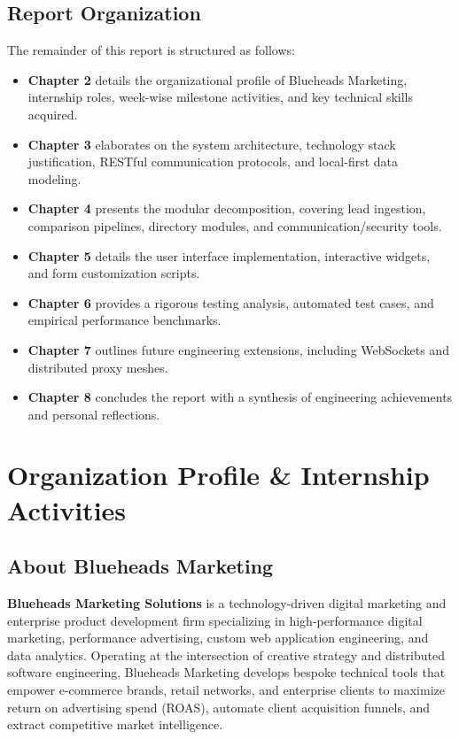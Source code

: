 \documentclass[12pt,a4paper,oneside]{report}
\begin{document}
\section{Report Organization}
The remainder of this report is structured as follows:
\begin{itemize}
    \item \textbf{Chapter 2} details the organizational profile of Blueheads Marketing, internship roles, week-wise milestone activities, and key technical skills acquired.
    \item \textbf{Chapter 3} elaborates on the system architecture, technology stack justification, RESTful communication protocols, and local-first data modeling.
    \item \textbf{Chapter 4} presents the modular decomposition, covering lead ingestion, comparison pipelines, directory modules, and communication/security tools.
    \item \textbf{Chapter 5} details the user interface implementation, interactive widgets, and form customization scripts.
    \item \textbf{Chapter 6} provides a rigorous testing analysis, automated test cases, and empirical performance benchmarks.
    \item \textbf{Chapter 7} outlines future engineering extensions, including WebSockets and distributed proxy meshes.
    \item \textbf{Chapter 8} concludes the report with a synthesis of engineering achievements and personal reflections.
\end{itemize}

\chapter{Organization Profile \& Internship Activities}

\section{About Blueheads Marketing}
\textbf{Blueheads Marketing Solutions} is a technology-driven digital marketing and enterprise product development firm specializing in high-performance digital marketing, performance advertising, custom web application engineering, and data analytics. Operating at the intersection of creative strategy and distributed software engineering, Blueheads Marketing develops bespoke technical tools that empower e-commerce brands, retail networks, and enterprise clients to maximize return on advertising spend (ROAS), automate client acquisition funnels, and extract competitive market intelligence.
\end{document}
